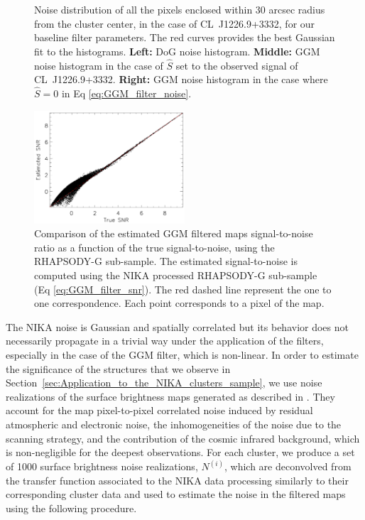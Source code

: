 \documentclass[twocolumn,traditabstract]{aa}
\begin{document}
\begin{figure}[h]
\caption{\footnotesize{Noise distribution of all the pixels enclosed within 30 arcsec radius from the cluster center, in the case of \mbox{CL~J1226.9+3332}, for our baseline filter parameters. The red curves provides the best Gaussian fit to the histograms. {\bf Left:} DoG noise histogram. {\bf Middle:} GGM noise histogram in the case of $\hat{S}$ set to the observed signal of \mbox{CL~J1226.9+3332}. {\bf Right:} GGM noise histogram in the case where $\hat{S} = 0$ in Eq \ref{eq:GGM_filter_noise}.}}
\label{fig:noise_statistics1}
\end{figure}

\begin{figure}[h]
\centering
\includegraphics[width=0.5\textwidth]{Figure/Conta_noise_Grad_SNRtrueVSmeasRG377_00181_Ymap_zobs0p5_15_15_45.pdf}
\caption{\footnotesize{Comparison of the estimated GGM filtered maps signal-to-noise ratio as a function of the true signal-to-noise, using the RHAPSODY-G sub-sample. The estimated signal-to-noise is computed using the NIKA processed RHAPSODY-G sub-sample (Eq \ref{eq:GGM_filter_snr}). The red dashed line represent the one to one correspondence. Each point corresponds to a pixel of the map.}}
\label{fig:noise_statistics2}
\end{figure}

The NIKA noise is Gaussian and spatially correlated \citep{Adam2016a} but its behavior does not necessarily propagate in a trivial way under the application of the filters, especially in the case of the GGM filter, which is non-linear. In order to estimate the significance of the structures that we observe in Section~\ref{sec:Application_to_the_NIKA_clusters_sample}, we use noise realizations of the surface brightness maps generated as described in \cite{Adam2016a}. They account for the map pixel-to-pixel correlated noise induced by residual atmospheric and electronic noise, the inhomogeneities of the noise due to the scanning strategy, and the contribution of the cosmic infrared background, which is non-negligible for the deepest observations. For each cluster, we produce a set of 1000 surface brightness noise realizations, $N^{(i)}$, which are deconvolved from the transfer function associated to the NIKA data processing similarly to their corresponding cluster data and used to estimate the noise in the filtered maps using the following procedure. 
\end{document}
